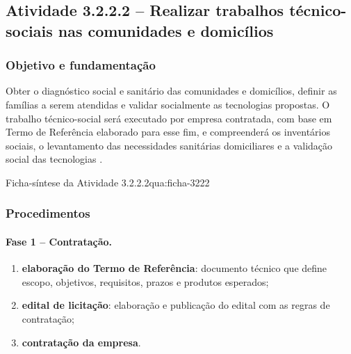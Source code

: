 \subsection{Atividade 3.2.2.2 -- Realizar trabalhos técnico-sociais nas comunidades e domicílios}
\label{subsec:tts}

\subsubsection{Objetivo e fundamentação}

Obter o diagnóstico social e sanitário das comunidades e domicílios, definir
as famílias a serem atendidas e validar socialmente as tecnologias propostas.
O trabalho técnico-social será executado por empresa contratada, com base em
Termo de Referência elaborado para esse fim, e compreenderá os inventários
sociais, o levantamento das necessidades sanitárias domiciliares e a
validação social das tecnologias \cite{mop2026}.

\begin{fichaatividade}{Ficha-síntese da Atividade 3.2.2.2}{qua:ficha-3222}
\end{fichaatividade}

\subsubsection{Procedimentos}

\paragraph{Fase 1 -- Contratação.}
\begin{enumerate}[label=\alph*)]
  \item \textbf{elaboração do Termo de Referência}: documento técnico que
        define escopo, objetivos, requisitos, prazos e produtos esperados;
  \item \textbf{edital de licitação}: elaboração e publicação do edital com
        as regras de contratação;
  \item \textbf{contratação da empresa}.
\end{enumerate}

